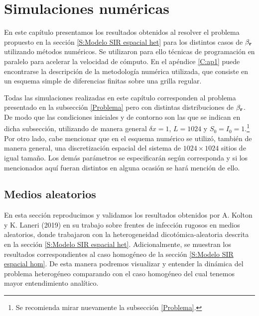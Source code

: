 \chapter{Simulaciones numéricas}
\graphicspath{{figs/}}
\label{Simulaciones}

En este capítulo presentamos los resultados obtenidos al resolver el problema propuesto en la sección \ref{S:Modelo SIR espacial het} para los 
distintos casos de $\beta_{\vb r}$ utilizando métodos numéricos. Se utilizaron para ello técnicas de programación en paralelo para acelerar la
velocidad de cómputo. En el apéndice \ref{C:ap1} puede encontrarse la descripción de la metodología numérica utilizada, que consiste en un esquema simple de 
diferencias finitas sobre una grilla regular.

Todas las simulaciones realizadas en este capítulo corresponden al problema presentado en la subsección \ref{Problema} pero con distintas distribuciones de 
$\beta_{\vb r}$. De modo que las condiciones iniciales y de contorno son las que se indican en dicha subsección, utilizando de manera 
general $\delta x=1$, $L=1024$ y $S_0=I_0=1$.\footnote{Se recomienda mirar nuevamente la subsección \ref{Problema}.} Por otro lado, cabe mencionar que en el esquema numérico se utilizó, también de manera general, una discretización 
espacial del sistema de $1024\times1024$ sitios de igual tamaño. Los demás parámetros se especificarán según corresponda y 
si los mencionados aquí fueran distintos en alguna ocasión se hará mención de ello.

\section{Medios aleatorios}

\label{S:aleatorios}
En esta sección reproducimos y validamos los resultados obtenidos por A. Kolton y K. Laneri (2019) \cite{kolton} en su trabajo sobre frentes de 
infección rugosos en medios aleatorios, donde trabajaron con la heterogeneidad dicotómica-aleatoria descrita en la sección \ref{S:Modelo SIR espacial het}. 
Adicionalmente, se muestran los resultados correspondientes al caso homogéneo de la sección \ref{S:Modelo SIR espacial hom}. De esta manera podremos visualizar 
y entender la dinámica del problema heterogéneo comparando con el caso homogéneo del cual tenemos mayor entendimiento analítico.



